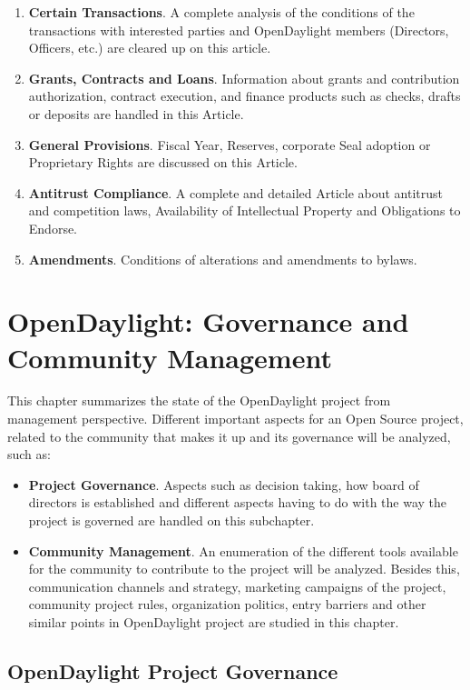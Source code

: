 \documentclass[a4paper, 12pt]{book}
\begin{document}
\begin{enumerate}
 \item{\textbf{Certain Transactions}}. A complete analysis of the conditions of the transactions with interested parties and OpenDaylight members (Directors, Officers, etc.) are cleared up on this article.
 \item{\textbf{Grants, Contracts and Loans}}. Information about grants and contribution authorization, contract execution, and finance products such as checks, drafts or deposits are handled in this Article.
 \item{\textbf{General Provisions}}. Fiscal Year, Reserves, corporate Seal adoption or Proprietary Rights are discussed on this Article.
 \item{\textbf{Antitrust Compliance}}. A complete and detailed Article about antitrust and competition laws, Availability of Intellectual Property and Obligations to Endorse.
 \item{\textbf{Amendments}}. Conditions of alterations and amendments to bylaws.
\end{enumerate}

\chapter{OpenDaylight: Governance and Community Management}
\label{chap:odlcommunity}

This chapter summarizes the state of the OpenDaylight project from management perspective. Different important aspects for an Open Source project, related to the community that makes it up and its governance will be analyzed, such as:
\begin{itemize}\itemsep0pt
\item{\textbf{Project Governance}}. Aspects such as decision taking, how board of directors is established and different aspects having to do with the way the project is governed are handled on this subchapter.
\item{\textbf{Community Management}}. An enumeration of the different tools available for the community to contribute to the project will be analyzed. Besides this, communication channels and strategy, marketing campaigns of the project, community project rules, organization politics, entry barriers and other similar points in OpenDaylight project are studied in this chapter.
\end{itemize}

\section{OpenDaylight Project Governance}
\label{sec:odlgovernance}
\end{document}
